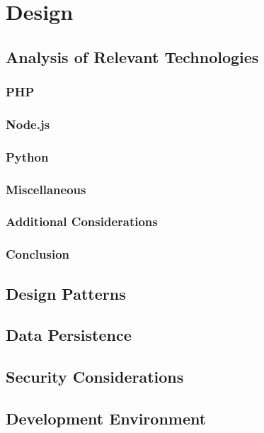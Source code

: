 \chapter{Design}

\section{Analysis of Relevant Technologies}

\subsection{PHP}

\subsection{Node.js}

\subsection{Python}

\subsection{Miscellaneous}

\subsection{Additional Considerations}

\subsection{Conclusion}

\section{Design Patterns}

\section{Data Persistence}

\section{Security Considerations}

\section{Development Environment}

